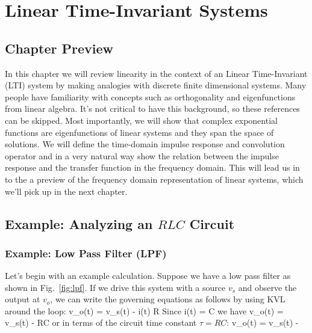 

\chapter{Linear Time-Invariant Systems}




\graphicspath{{./figs_LTI/}}




\section{Chapter Preview}


In this chapter we will review linearity in the context of an Linear Time-Invariant (LTI) system by making analogies with discrete finite dimensional systems.  Many people have familiarity with concepts such as orthogonality and eigenfunctions from linear algebra.  It's not critical to have this background, so these references can be skipped.  Most importantly, we will show that complex exponential functions are eigenfunctions of linear systems and they span the space of solutions.  We will define the time-domain impulse response and convolution operator and in a very natural way show the relation between the impulse response and the transfer function in the frequency domain.  This will lead us in to the a preview of the frequency domain representation of linear systems, which we'll pick up in the next chapter.







\section{Example:  Analyzing an $RLC$ Circuit}





\subsection{Example:  Low Pass Filter (LPF)}

Let's begin with an example calculation.  Suppose we have a low pass filter as shown in Fig.~\ref{fig:lpf}.  If we drive this system with a source $v_s$ and observe the output at $v_o$, we can write the governing equations as follows by using KVL around the loop:
\be v_o(t) = v_s(t) - i(t) R \ee
Since
\be i(t) = C   \ee
we have
\be v_o(t) = v_s(t) - RC   \ee
or in terms of the circuit time constant $\tau = RC$:
\be v_o(t) = v_s(t) - \tau {}  \ee

